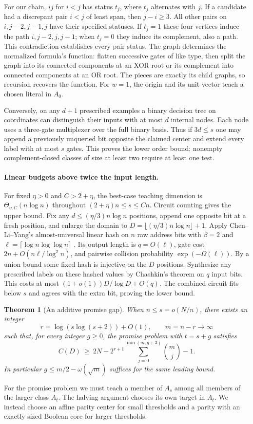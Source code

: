\documentclass[11pt]{article}
\newtheorem{theorem}{Theorem}
\begin{document}
For our chain, $ij$ for $i<j$ has status $t_j$, where $t_j$ alternates with $j$. If a candidate had a discrepant pair $i<j$ of least span, then $j-i\ge3$. All other pairs on $i,j-2,j-1,j$ have their specified statuses. If $t_j=1$ these four vertices induce the path $i,j-2,j,j-1$; when $t_j=0$ they induce its complement, also a path. This contradiction establishes every pair status. The graph determines the normalized formula's function: flatten successive gates of like type, then split the graph into its connected components at an XOR root or its complement into connected components at an OR root. The pieces are exactly its child graphs, so recursion recovers the function. For $w=1$, the origin and its unit vector teach a chosen literal in $A_0$.

Conversely, on any $d+1$ prescribed examples a binary decision tree on coordinates can distinguish their inputs with at most $d$ internal nodes. Each node uses a three-gate multiplexer over the full binary basis. Thus if $3d\le s$ one may append a previously unqueried bit opposite the claimed center and extend every label with at most $s$ gates. This proves the lower order bound; nonempty complement-closed classes of size at least two require at least one test.

\paragraph{Linear budgets above twice the input length.}
For fixed $\eta>0$ and $C>2+\eta$, the best-case teaching dimension is $\Theta_{\eta,C}(n\log n)$ throughout $(2+\eta)n\le s\le Cn$. Circuit counting gives the upper bound. Fix any $d\le(\eta/3)n\log n$ positions, append one opposite bit at a fresh position, and enlarge the domain to $D=\lfloor(\eta/3)n\log n\rfloor+1$. Apply Chen--Li--Yang's almost-universal linear hash on $n$ raw address bits with $\beta=2$ and $\ell=\lceil\log n\log\log n\rceil$ \cite[Theorem~3.9]{cly}. Its output length is $q=O(\ell)$, gate cost $2n+O(n\ell/\log^2n)$, and pairwise collision probability $\exp(-\Omega(\ell))$. By a union bound some fixed hash is injective on the $D$ positions. Synthesize any prescribed labels on these hashed values by Chashkin's theorem on $q$ input bits. This costs at most $(1+o(1))D/\log D+O(q)$. The combined circuit fits below $s$ and agrees with the extra bit, proving the lower bound.
\begin{theorem}[An additive promise gap]\label{thm:gap}
When $n\le s=o(N/n)$, there exists an integer
\[
 r=\log(s\log(s+2))+O(1), \qquad m=n-r\longrightarrow\infty
\]
such that, for every integer $g\ge0$, the promise problem with $t=s+g$ satisfies
\[
 C(D)\ \ge\ 2N-2^{r+1}\sum_{j=0}^{\min(m,g+3)}\binom mj-1 .
\]
In particular $g\le m/2-\omega(\sqrt m)$ suffices for the same leading bound.
\end{theorem}
For the promise problem we must teach a member of $A_s$ among all members of the larger class $A_t$. The halving argument chooses its own target in $A_t$. We instead choose an affine parity center for small thresholds and a parity with an exactly sized Boolean core for larger thresholds.
\end{document}
